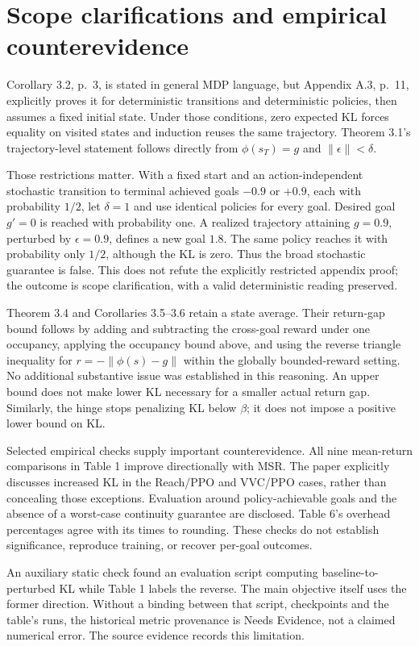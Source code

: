 \documentclass[10pt]{article}
\begin{document}
\section*{Scope clarifications and empirical counterevidence}
Corollary 3.2, p. 3, is stated in general MDP language, but Appendix A.3, p. 11, explicitly proves it for deterministic transitions and deterministic policies, then assumes a fixed initial state. Under those conditions, zero expected KL forces equality on visited states and induction reuses the same trajectory. Theorem 3.1’s trajectory-level statement follows directly from \(\phi(s_T)=g\) and \(\|\epsilon\|<\delta\).\par
Those restrictions matter. With a fixed start and an action-independent stochastic transition to terminal achieved goals \(-0.9\) or \(+0.9\), each with probability \(1/2\), let \(\delta=1\) and use identical policies for every goal. Desired goal \(g'=0\) is reached with probability one. A realized trajectory attaining \(g=0.9\), perturbed by \(\epsilon=0.9\), defines a new goal \(1.8\). The same policy reaches it with probability only \(1/2\), although the KL is zero. Thus the broad stochastic guarantee is false. This does not refute the explicitly restricted appendix proof; the outcome is scope clarification, with a valid deterministic reading preserved.\par
Theorem 3.4 and Corollaries 3.5–3.6 retain a state average. Their return-gap bound follows by adding and subtracting the cross-goal reward under one occupancy, applying the occupancy bound above, and using the reverse triangle inequality for \(r=-\|\phi(s)-g\|\) within the globally bounded-reward setting. No additional substantive issue was established in this reasoning. An upper bound does not make lower KL necessary for a smaller actual return gap. Similarly, the hinge stops penalizing KL below \(\beta\); it does not impose a positive lower bound on KL.\par
Selected empirical checks supply important counterevidence. All nine mean-return comparisons in Table 1 improve directionally with MSR. The paper explicitly discusses increased KL in the Reach/PPO and VVC/PPO cases, rather than concealing those exceptions. Evaluation around policy-achievable goals and the absence of a worst-case continuity guarantee are disclosed. Table 6’s overhead percentages agree with its times to rounding. These checks do not establish significance, reproduce training, or recover per-goal outcomes.\par
An auxiliary static check found an evaluation script computing baseline-to-perturbed KL while Table 1 labels the reverse. The main objective itself uses the former direction. Without a binding between that script, checkpoints and the table’s runs, the historical metric provenance is Needs Evidence, not a claimed numerical error. The source evidence records this limitation.\par
\end{document}
